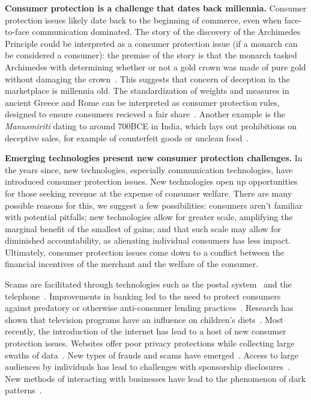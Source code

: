 \textbf{Consumer protection is a challenge that dates back millennia.}
Consumer protection issues likely date back to the beginning of commerce, even when face-to-face communication dominated. The story of the discovery of the Archimedes Principle could be interpreted as a consumer protection issue (if a monarch can be considered a consumer): the premise of the story is that the monarch tasked Archimedes with determining whether or not a gold crown was made of pure gold without damaging the crown~\cite{thompson2008archimedes}. This suggests that concern of deception in the marketplace is millennia old.  The standardization of weights and measures in ancient Greece and Rome can be interpreted as consumer protection rules, designed to ensure consumers recieved a fair share~\cite{smither2017roman}. Another example is the \textit{Manusmiriti} dating to around 700BCE in India, which lays out prohibitions on deceptive sales, for example of counterfeit goods or unclean food~\cite{devi2016legal}.

\textbf{Emerging technologies present new consumer protection challenges.}
In the years since, new technologies, especially communication technologies, have introduced consumer protection issues. New technologies open up opportunities for those seeking revenue at the expense of consumer welfare. There are many possible reasons for this, we suggest a few possibilities: consumers aren't familiar with potential pitfalls; new technologies allow for greater scale, amplifying the marginal benefit of the smallest of gains; and that such scale may allow for diminished accountability, as alienating individual consumers has less impact. Ultimately, consumer protection issues come down to a conflict between the financial incentives of the merchant and the welfare of the consumer.

Scams are facilitated through technologies such as the postal system~\cite{uspismailfraud} and the telephone~\cite{ftcphonescams}. Improvements in banking led to the need to protect consumers against predatory or otherwise anti-consumer lending practices~\cite{eaglesham2011warning,doddfrank}. Research has shown that television programs have an influence on children's diets~\cite{morton1985television}. Most recently, the introduction of the internet has lead to a host of new consumer protection issues. Websites offer poor privacy protections while collecting large swaths of data~\cite{estrada2017online}. New types of frauds and scams have emerged~\cite{ftcscamalerts}. Access to large audiences by individuals has lead to challenges with sponsorship disclosures~\cite{ftc2021disclosures}. New methods of interacting with businesses have lead to the phenomenon of dark patterns~\cite{darkpatternsorg}.

